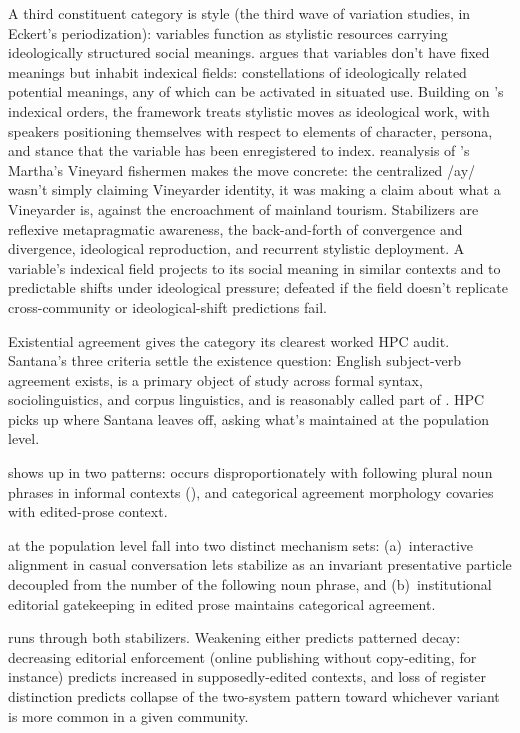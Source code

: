 \documentclass[12pt]{article}
\begin{document}
A third constituent category is style (the third wave of variation studies, in Eckert's periodization): variables function as stylistic resources carrying ideologically structured social meanings. \textcite{eckert2008indexical} argues that variables don't have fixed meanings but inhabit indexical fields: constellations of ideologically related potential meanings, any of which can be activated in situated use. Building on \textcite{silverstein2003indexical}'s indexical orders, the framework treats stylistic moves as ideological work, with speakers positioning themselves with respect to elements of character, persona, and stance that the variable has been enregistered to index.  reanalysis of \citeauthor{labov1972}'s Martha's Vineyard fishermen makes the move concrete: the centralized /ay/ wasn't simply claiming Vineyarder identity, it was making a claim about what a Vineyarder is, against the encroachment of mainland tourism. Stabilizers are reflexive metapragmatic awareness, the back-and-forth of convergence and divergence, ideological reproduction, and recurrent stylistic deployment. A variable's indexical field projects to its social meaning in similar contexts and to predictable shifts under ideological pressure; defeated if the field doesn't replicate cross-community or ideological-shift predictions fail.

Existential agreement gives the category its clearest worked HPC audit. Santana's three criteria settle the existence question: English subject-verb agreement exists, is a primary object of study across formal syntax, sociolinguistics, and corpus linguistics, and is reasonably called part of . HPC picks up where Santana leaves off, asking what's maintained at the population level.

 shows up in two patterns:  occurs disproportionately with following plural noun phrases in informal contexts (), and categorical agreement morphology covaries with edited-prose context.

 at the population level fall into two distinct mechanism sets: (a)~interactive alignment in casual conversation lets  stabilize as an invariant presentative particle decoupled from the number of the following noun phrase, and (b)~institutional editorial gatekeeping in edited prose maintains categorical agreement.

 runs through both stabilizers. Weakening either predicts patterned decay: decreasing editorial enforcement (online publishing without copy-editing, for instance) predicts increased  in supposedly-edited contexts, and loss of register distinction predicts collapse of the two-system pattern toward whichever variant is more common in a given community.
\end{document}
